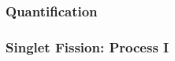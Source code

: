 \documentclass[compress]{beamer}
\begin{document}
\begin{frame}
  \frametitle{Quantification}
%
%
\end{frame}

\begin{frame}
  \frametitle{Singlet Fission: Process I}
%


\end{frame}
\end{document}
